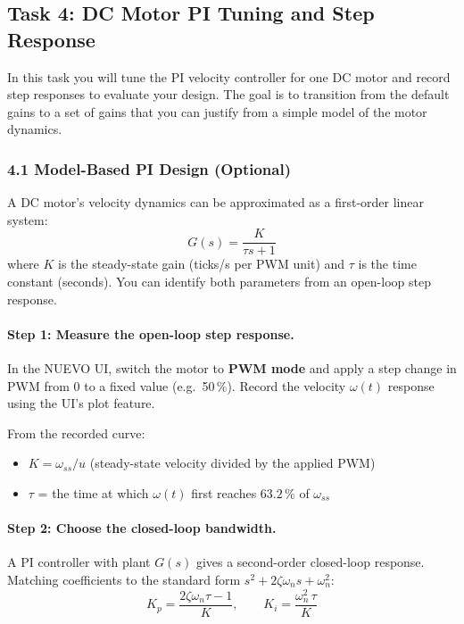 \documentclass{ol-softwaremanual}
\begin{document}
\subsection{Task 4: DC Motor PI Tuning and Step Response}

In this task you will tune the PI velocity controller for one DC motor and record
step responses to evaluate your design.
The goal is to transition from the default gains to a set of gains that you can
justify from a simple model of the motor dynamics.

\subsubsection*{4.1 Model-Based PI Design (Optional)}

A DC motor's velocity dynamics can be approximated as a first-order linear system:
\begin{equation}
  G(s) = \frac{K}{\tau s + 1}
  \label{eq:motor_model}
\end{equation}
where $K$ is the steady-state gain (ticks/s per PWM unit) and $\tau$ is the time
constant (seconds).
You can identify both parameters from an open-loop step response.

\paragraph{Step 1: Measure the open-loop step response.}
In the NUEVO UI, switch the motor to \textbf{PWM mode} and apply a step change in
PWM from 0 to a fixed value (e.g.\ 50\,\%).
Record the velocity $\omega(t)$ response using the UI's plot feature.

From the recorded curve:
\begin{itemize}
  \item $K = \omega_{ss} / u$ \quad (steady-state velocity divided by the applied PWM)
  \item $\tau$ = the time at which $\omega(t)$ first reaches $63.2\,\%$ of $\omega_{ss}$
\end{itemize}

\paragraph{Step 2: Choose the closed-loop bandwidth.}
A PI controller with plant $G(s)$ gives a second-order closed-loop response.
Matching coefficients to the standard form $s^2 + 2\zeta\omega_n s + \omega_n^2$:
\begin{equation}
  K_p = \frac{2\zeta\omega_n\tau - 1}{K}, \qquad
  K_i = \frac{\omega_n^2 \,\tau}{K}
  \label{eq:pi_gains}
\end{equation}
\end{document}
